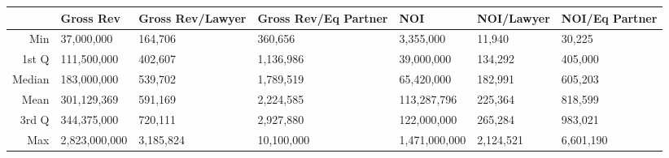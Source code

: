 \begin{table}[ht]
\centering
\begin{tabular}{rllllll}
  \hline
 & Gross Rev & Gross Rev/Lawyer & Gross Rev/Eq Partner & NOI & NOI/Lawyer & NOI/Eq Partner \\ 
  \hline
Min & 37,000,000 & 164,706 & 360,656 & 3,355,000 & 11,940 & 30,225 \\ 
  1st Q & 111,500,000 & 402,607 & 1,136,986 & 39,000,000 & 134,292 & 405,000 \\ 
  Median & 183,000,000 & 539,702 & 1,789,519 & 65,420,000 & 182,991 & 605,203 \\ 
  Mean & 301,129,369 & 591,169 & 2,224,585 & 113,287,796 & 225,364 & 818,599 \\ 
  3rd Q & 344,375,000 & 720,111 & 2,927,880 & 122,000,000 & 265,284 & 983,021 \\ 
  Max & 2,823,000,000 & 3,185,824 & 10,100,000 & 1,471,000,000 & 2,124,521 & 6,601,190 \\ 
   \hline
\end{tabular}
\end{table}
